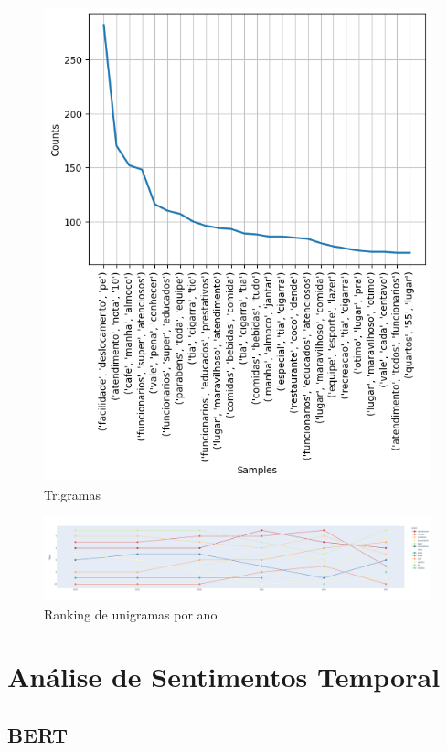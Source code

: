 \begin{figure}
	\centering
	\includegraphics[width=.8\textwidth]{figs/exploratoria/trigramas.png}
	\caption{Trigramas}
	\label{img:trigramas}
\end{figure}

\begin{figure}
	\centering
	\includegraphics[width=.7\textwidth]{figs/exploratoria/ranking_unigramas_por_ano.png}
	\caption{Ranking de unigramas por ano}
	\label{img:rank_unigramas}
\end{figure}

\section{Análise de Sentimentos Temporal}
\label{cap:resultados:sec:analise_sentimento}

\subsection[BERT]{BERT}
\label{sec:resultados:subsec:bert}

